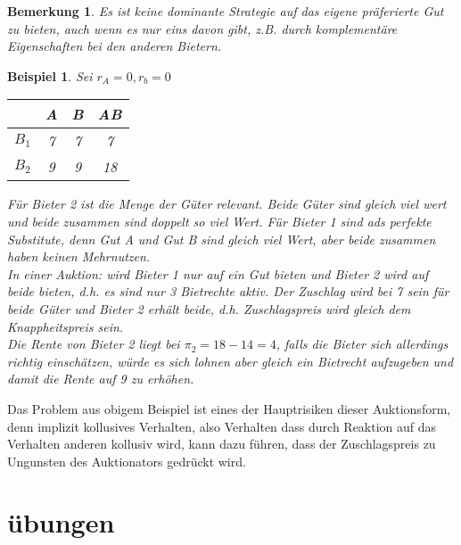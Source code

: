 \documentclass[12pt]{extreport} %
\theoremstyle{named}
\theoremstyle{nnamed}
\theoremstyle{itshape}
\theoremstyle{normal}
\newtheorem{beispiel}[unnamedtheorem]{Beispiel}
\newtheorem*{bemerkung}{Bemerkung}
\begin{document}
\begin{bemerkung}
	Es ist keine dominante Strategie auf das eigene präferierte Gut zu bieten, auch wenn es nur eins davon gibt, z.B. durch komplementäre Eigenschaften bei den anderen Bietern.	
\end{bemerkung}

\begin{beispiel}
	Sei $r_A = 0, r_b = 0$
	\begin{figure*}[h!] \centering
		\begin{tabular}{l|ccc}
			& A & B & AB \\
  				\hline
  			$B_1$ & 7 & 7 & 7  \\
  			$B_2$ & 9 & 9 & 18  
		\end{tabular}
	\end{figure*}
	Für Bieter 2 ist die Menge der Güter relevant. Beide Güter sind gleich viel wert und beide zusammen sind doppelt so viel Wert. Für Bieter 1 sind ads perfekte Substitute, denn Gut A und Gut B sind gleich viel Wert, aber beide zusammen haben keinen Mehrnutzen. ~\\
	
	In einer Auktion: wird Bieter 1 nur auf ein Gut bieten und Bieter 2 wird auf beide bieten, d.h. es sind nur 3 Bietrechte aktiv. Der Zuschlag wird bei 7 sein für beide Güter und Bieter 2 erhält beide, d.h. Zuschlagspreis wird gleich dem Knappheitspreis sein.~\\
	
	Die Rente von Bieter 2 liegt bei $\pi_2 = 18- 14 = 4$, falls die Bieter sich allerdings richtig einschätzen, würde es sich lohnen aber gleich ein Bietrecht aufzugeben und damit die Rente auf 9 zu erhöhen.
\end{beispiel}


Das Problem aus obigem Beispiel ist eines der Hauptrisiken dieser Auktionsform, denn implizit kollusives Verhalten, also Verhalten dass durch Reaktion auf das Verhalten anderen kollusiv wird, kann dazu führen, dass der Zuschlagspreis zu Ungunsten des Auktionators gedrückt wird.


\newpage

 \appendix {}  

\chapter*{übungen}
\end{document}
